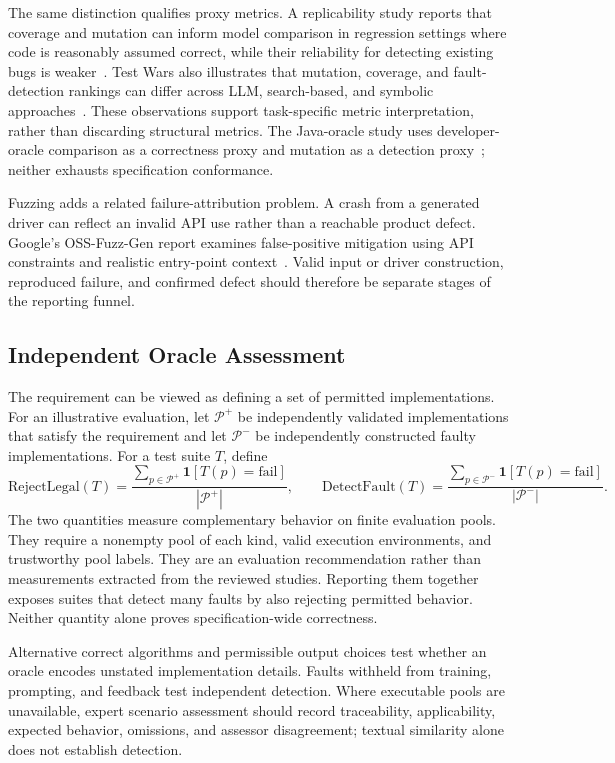 The same distinction qualifies proxy metrics. A replicability study reports that coverage and mutation can inform model comparison in regression settings where code is reasonably assumed correct, while their reliability for detecting existing bugs is weaker~\cite{E05}. Test Wars also illustrates that mutation, coverage, and fault-detection rankings can differ across LLM, search-based, and symbolic approaches~\cite{E08}. These observations support task-specific metric interpretation, rather than discarding structural metrics. The Java-oracle study uses developer-oracle comparison as a correctness proxy and mutation as a detection proxy~\cite{E07}; neither exhausts specification conformance.

Fuzzing adds a related failure-attribution problem. A crash from a generated driver can reflect an invalid API use rather than a reachable product defect. Google's OSS-Fuzz-Gen report examines false-positive mitigation using API constraints and realistic entry-point context~\cite{F09}. Valid input or driver construction, reproduced failure, and confirmed defect should therefore be separate stages of the reporting funnel.

\subsection{Independent Oracle Assessment}
The requirement can be viewed as defining a set of permitted implementations. For an illustrative evaluation, let $\mathcal{P}^{+}$ be independently validated implementations that satisfy the requirement and let $\mathcal{P}^{-}$ be independently constructed faulty implementations. For a test suite $T$, define
\begin{equation}
\mathrm{RejectLegal}(T)=\frac{\sum_{p\in\mathcal{P}^{+}}\mathbf{1}[T(p)=\mathrm{fail}]}{|\mathcal{P}^{+}|},\qquad
\mathrm{DetectFault}(T)=\frac{\sum_{p\in\mathcal{P}^{-}}\mathbf{1}[T(p)=\mathrm{fail}]}{|\mathcal{P}^{-}|}.
\end{equation}
The two quantities measure complementary behavior on finite evaluation pools. They require a nonempty pool of each kind, valid execution environments, and trustworthy pool labels. They are an evaluation recommendation rather than measurements extracted from the reviewed studies. Reporting them together exposes suites that detect many faults by also rejecting permitted behavior. Neither quantity alone proves specification-wide correctness.

Alternative correct algorithms and permissible output choices test whether an oracle encodes unstated implementation details. Faults withheld from training, prompting, and feedback test independent detection. Where executable pools are unavailable, expert scenario assessment should record traceability, applicability, expected behavior, omissions, and assessor disagreement; textual similarity alone does not establish detection.

